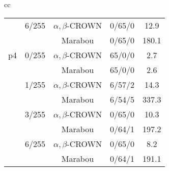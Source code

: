 \begin{table*}[htbp]
\begin{tabular}{cc}
\begin{minipage}{0.48\linewidth}
\begin{tabular}{|c|c|c|c|c|}
\cline{2-5}
 & 6/255 & $\alpha, \beta$-CROWN & 0/65/0 & 12.9 \\
 &  & Marabou & 0/65/0 & 180.1 \\
\cline{2-5}
\hline
p4 & 0/255 & $\alpha, \beta$-CROWN & 65/0/0 & 2.7 \\
 &  & Marabou & 65/0/0 & 2.6 \\
\cline{2-5}
 & 1/255 & $\alpha, \beta$-CROWN & 6/57/2 & 14.3 \\
 &  & Marabou & 6/54/5 & 337.3 \\
\cline{2-5}
 & 3/255 & $\alpha, \beta$-CROWN & 0/65/0 & 10.3 \\
 &  & Marabou & 0/64/1 & 197.2 \\
\cline{2-5}
 & 6/255 & $\alpha, \beta$-CROWN & 0/65/0 & 8.2 \\
 &  & Marabou & 0/64/1 & 191.1 \\
\cline{2-5}
\hline
\end{tabular}


\end{minipage}
\end{tabular}
\end{table*}
